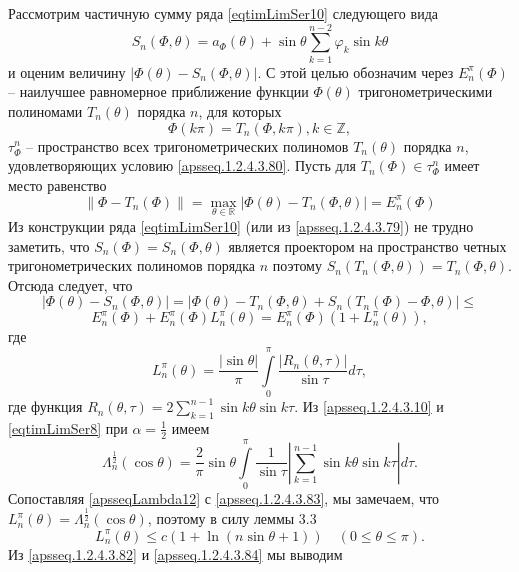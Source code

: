Рассмотрим частичную сумму ряда \eqref{eqtimLimSer10} следующего вида
\begin{equation}\label{apsseq.1.2.4.3.79}S_n(\Phi,\theta)=a_\Phi(\theta)+\sin\theta\sum\limits_{k=1}^{n-2}\varphi_k\sin k\theta\end{equation}
и оценим величину $|\Phi(\theta)-S_n(\Phi,\theta)|$. С этой целью обозначим через $E^\pi_n(\Phi)$ -- наилучшее равномерное приближение функции $\Phi(\theta)$ тригонометрическими полиномами $T_n(\theta)$ порядка $n$, для которых
\begin{equation}\label{apsseq.1.2.4.3.80}
\Phi(k\pi)=T_n(\Phi,k\pi),k\in\mathbb{Z},
\end{equation}
$\tau_\Phi^n$ -- пространство всех тригонометрических полиномов $T_n(\theta)$ порядка $n$, удовлетворяющих условию \eqref{apsseq.1.2.4.3.80}. Пусть для $T_n(\Phi)\in\tau_\Phi^n$ имеет место равенство
\begin{equation}\label{apsseq.1.2.4.3.81}\|\Phi-T_n(\Phi)\|=\max_{\theta\in\mathbb{R}}|\Phi(\theta)-T_n(\Phi,\theta)|=E^\pi_n(\Phi)\end{equation}
Из конструкции ряда \eqref{eqtimLimSer10} (или из \eqref{apsseq.1.2.4.3.79}) не трудно заметить, что $S_n(\Phi)=S_n(\Phi,\theta)$ является проектором на пространство четных тригонометрических полиномов порядка $n$ поэтому $S_n(T_n(\Phi,\theta))=T_n(\Phi,\theta)$. Отсюда следует, что
$$|\Phi(\theta)-S_n(\Phi,\theta)|=|\Phi(\theta)-T_n(\Phi,\theta)+S_n(T_n(\Phi)-\Phi,\theta)|\le$$
\begin{equation}\label{apsseq.1.2.4.3.82}E_n^\pi(\Phi)+E_n^\pi(\Phi)L_n^\pi(\theta)=E_n^\pi(\Phi)(1+L_n^\pi(\theta)),\end{equation}
где
\begin{equation}\label{apsseq.1.2.4.3.83}L_n^\pi(\theta)=\frac{|\sin\theta|}{\pi}\int\limits_0^\pi\frac{|R_n(\theta,\tau)|}{\sin\tau}d\tau,\end{equation}
где функция $R_n(\theta,\tau)=2\sum\limits_{k=1}^{n-1}\sin k\theta\sin k\tau$. Из \eqref{apsseq.1.2.4.3.10} и \eqref{eqtimLimSer8} при $\alpha=\frac12$ имеем \begin{equation}\label{apsseqLambda12}
\Lambda^{\frac12}_n(\cos\theta)=\frac2\pi\sin\theta\int\limits_0^\pi\frac1{\sin\tau}\left|\sum\limits_{k=1}^{n-1}\sin k\theta\sin k\tau\right|d\tau.
\end{equation}
Сопоставляя \eqref{apsseqLambda12} с \eqref{apsseq.1.2.4.3.83}, мы замечаем, что $L_n^\pi(\theta)=\Lambda^{\frac12}_n(\cos\theta)$, поэтому в силу леммы 3.3
\begin{equation}\label{apsseq.1.2.4.3.84}L_n^\pi(\theta)\le c(1+\ln(n\sin\theta+1))\quad(0\le\theta\le\pi).\end{equation}
Из \eqref{apsseq.1.2.4.3.82} и \eqref{apsseq.1.2.4.3.84} мы выводим

